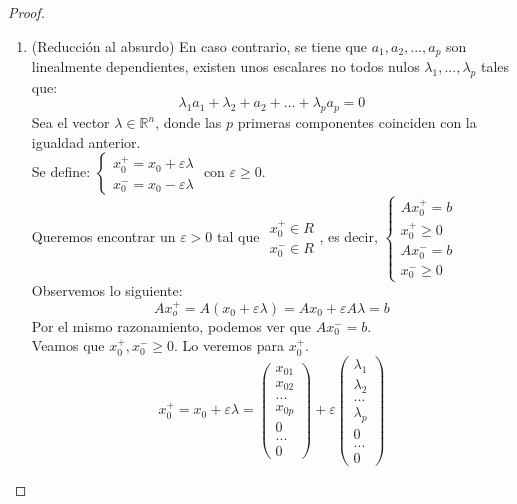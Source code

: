 \documentclass[11pt,fleqn]{book} %
\begin{document}
\begin{proof}
\begin{enumerate}
		\item (Reducción al absurdo) En caso contrario, se tiene que $a_1, a_2, ..., a_p$ son linealmente dependientes, existen unos escalares no todos nulos $\lambda_1, ..., \lambda_p$ tales que:
		$$
			\lambda_1 a_1+\lambda_2+a_2+...+\lambda_p a_p=0
		$$
		Sea el vector $\lambda \in \mathbb{R}^n$, donde las $p$ primeras componentes coinciden con la igualdad anterior. \\
		Se define: $\left\{
		\begin{array}{c}
		x_0^+=x_0+\varepsilon \lambda \\
		x_0^-=x_0-\varepsilon \lambda
		\end{array}
		 \right.$ con $\varepsilon \geq 0$. \\
		 Queremos encontrar un $\varepsilon>0$ tal que $\begin{array}{c}
		 x_0^+ \in R \\
		 x_0^- \in R
		 \end{array}$, es decir, $\left\{
		 \begin{array}{c}
		 Ax_0^+=b \\x_0^+ \geq 0 \\ Ax_0^-=b \\ x_0^- \geq 0
		 \end{array}\right.$ \\
		 Observemos lo siguiente:
		 $$
			 Ax_o^+=A(x_0+\varepsilon \lambda)=Ax_0+ \varepsilon A \lambda = b
		 $$
		 Por el mismo razonamiento, podemos ver que $Ax_0^-=b$.  \\
		 Veamos que $x_0^+, x_0^- \geq 0$. Lo veremos para $x_0^+$.
		$$
				 x_0^+=x_0+\varepsilon \lambda=\left(\begin{array}{c}
				 x_{01} \\
				 x_{02} \\
				 ... \\
				 x_{0p} \\
				 0 \\
				 ... \\
				 0
				 \end{array}\right)+\varepsilon\left(\begin{array}{c}
				 \lambda_{1} \\
				 \lambda_{2} \\
				 ... \\
				 \lambda_{p} \\
				 0 \\
				 ... \\
				 0
				 \end{array}\right)
$$
\end{enumerate}
\end{proof}
\end{document}
